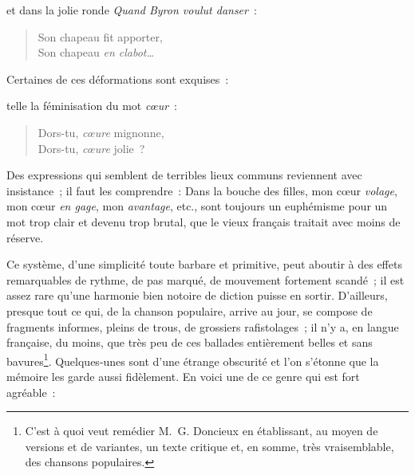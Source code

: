 \documentclass[french,twoside]{book} %
\begin{document}
\noindent et dans la jolie ronde {\itshape Quand Byron voulut danser} :\par


\begin{verse}
Son chapeau fit apporter,\\
Son chapeau {\itshape en clabot…}\\
\end{verse}

\noindent Certaines de ces déformations sont exquises :\par
telle la féminisation du mot {\itshape cœur} :\par


\begin{verse}
Dors-tu, {\itshape cœure} mignonne,\\
Dors-tu, {\itshape cœure} jolie ?\\
\end{verse}

\noindent Des expressions qui semblent de terribles lieux communs reviennent avec insistance ; il faut les comprendre : Dans la bouche des filles, mon cœur {\itshape volage}, mon cœur {\itshape en gage}, mon {\itshape avantage}, etc., sont toujours un euphémisme pour un mot trop clair et devenu trop brutal, que le vieux français traitait avec moins de réserve.\par
Ce système, d’une simplicité toute barbare et primitive, peut aboutir à des effets remarquables de rythme, de pas marqué, de mouvement fortement scandé ; il est assez rare qu’une harmonie bien notoire de diction puisse en sortir. D’ailleurs, presque tout ce qui, de la chanson populaire, arrive au jour, se compose de fragments informes, pleins de trous, de grossiers rafistolages ; il n’y a, en langue française, du moins, que très peu de ces ballades entièrement belles et sans bavures\footnote{ C’est à quoi veut remédier M. G. Doncieux en établissant, au moyen de versions et de variantes, un texte critique et, en somme, très vraisemblable, des chansons populaires.}. Quelques-unes sont d’une étrange obscurité et l’on s’étonne que la mémoire les garde aussi fidèlement. En voici une de ce genre qui est fort agréable :\par
\end{document}
